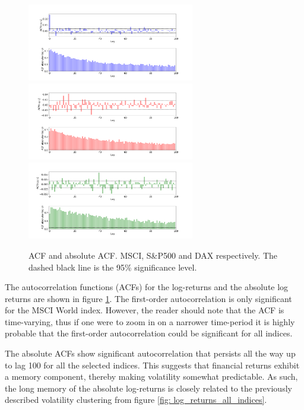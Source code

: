 \begin{figure}[H] 
    \centering
    \includegraphics[width=0.65\textwidth]{analysis/data_description/images/MSCI_ACF.png}
    \includegraphics[width=0.65\textwidth]{analysis/data_description/images/SP500_ACF.png}
    \includegraphics[width=0.65\textwidth]{analysis/data_description/images/DAX_ACF.png}
    \caption{ACF and absolute ACF. MSCI, S\&P500 and DAX respectively. The dashed black line is the 95\% significance level.}
    \label{fig: ACF_all_log_returns}
\end{figure}

The autocorrelation functions (ACFs) for the log-returns and the absolute log returns are shown in figure \ref{fig: ACF_all_log_returns}. The first-order autocorrelation is only significant for the MSCI World index. However, the reader should note that the ACF is time-varying, thus if one were to zoom in on a narrower time-period it is highly probable that the first-order autocorrelation could be significant for all indices. 

The absolute ACFs show significant autocorrelation that persists all the way up to lag 100 for all the selected indices. This suggests that financial returns exhibit a memory component, thereby making volatility somewhat predictable. As such, the long memory of the absolute log-returns is closely related to the previously described volatility clustering from figure \ref{fig: log_returns_all_indices}.

